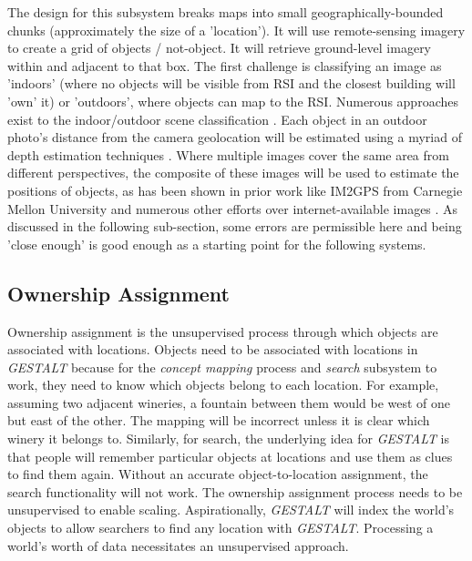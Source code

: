 The design for this subsystem breaks maps into small geographically-bounded chunks (approximately the size of a 'location'). 
It will use remote-sensing imagery to create a grid of objects / not-object. It will retrieve ground-level imagery within and adjacent to that box.
The first challenge is classifying an image as 'indoors' (where no objects will be visible from RSI and the closest building will 'own' it) or 'outdoors', where objects can map to the RSI. Numerous approaches exist to the indoor/outdoor scene classification \cite{Tong2017}. 
Each object in an outdoor photo's distance from the camera geolocation will be estimated using a myriad of depth estimation techniques \cite{Ming2021,Liu2020}. 
Where multiple images cover the same area from different perspectives, the composite of these images will be used to estimate the positions of objects, as has been shown in prior work like IM2GPS from Carnegie Mellon University \cite{Hays2008} and numerous other efforts over internet-available images \cite{Snavely2011}. 
As discussed in the following sub-section, some errors are permissible here and being 'close enough' is good enough as a starting point for the following systems. 

\subsection{Ownership Assignment}
Ownership assignment is the unsupervised process through which objects are associated with locations. 
Objects need to be associated with locations in \textit{GESTALT} because for the \textit{concept mapping} process and \textit{search} subsystem to work, they need to know which objects belong to each location.
For example, assuming two adjacent wineries, a fountain between them would be west of one but east of the other. The mapping will be incorrect unless it is clear which winery it belongs to. 
Similarly, for search, the underlying idea for \textit{GESTALT} is that people will remember particular objects at locations and use them as clues to find them again. Without an accurate object-to-location assignment, the search functionality will not work. 
The ownership assignment process needs to be unsupervised to enable scaling. Aspirationally, \textit{GESTALT} will index the world's objects to allow searchers to find any location with \textit{GESTALT}. Processing a world's worth of data necessitates an unsupervised approach. 

